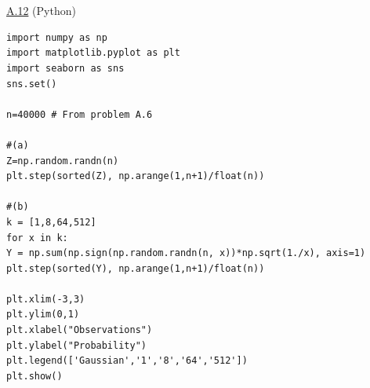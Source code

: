 \documentclass{article}
\newcommand{\1}{\mathbf{1}}
\begin{document}
\hfill \\ 
\hfill \\
\underline{A.12} (Python)
\begin{verbatim}
import numpy as np
import matplotlib.pyplot as plt
import seaborn as sns
sns.set()

n=40000 # From problem A.6

#(a)
Z=np.random.randn(n)
plt.step(sorted(Z), np.arange(1,n+1)/float(n))

#(b)
k = [1,8,64,512]
for x in k:
Y = np.sum(np.sign(np.random.randn(n, x))*np.sqrt(1./x), axis=1)
plt.step(sorted(Y), np.arange(1,n+1)/float(n))

plt.xlim(-3,3)
plt.ylim(0,1)
plt.xlabel("Observations")
plt.ylabel("Probability")
plt.legend(['Gaussian','1','8','64','512'])	
plt.show()
\end{verbatim}
\end{document}
